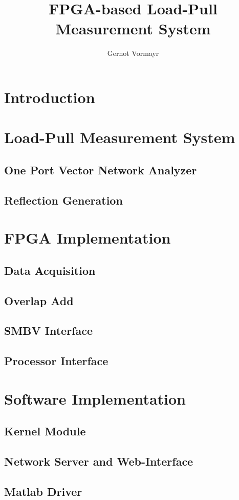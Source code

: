 \documentclass[12pt,a4paper,twoside,parskip=full]{scrreprt}
\author{Gernot Vormayr}
\title{FPGA-based Load-Pull Measurement System}
\begin{document}
\maketitle
\tableofcontents

\chapter{Introduction}
\chapter{Load-Pull Measurement System}
\section{One Port Vector Network Analyzer}
\section{Reflection Generation}
\chapter{FPGA Implementation}
\section{Data Acquisition}
\section{Overlap Add}
\section{SMBV Interface}
\section{Processor Interface}
\chapter{Software Implementation}
\section{Kernel Module}
\section{Network Server and Web-Interface}
\section{Matlab Driver}
\end{document}
